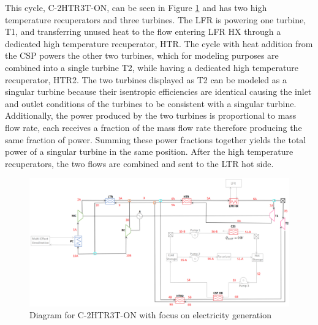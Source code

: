 \begin{paracol}{2}
This cycle, C-2HTR3T-ON, can be seen in Figure \ref{c-2htr3t-on} and has two high temperature recuperators and three turbines. The LFR is powering one turbine, T1, and transferring unused heat to the flow entering LFR HX through a dedicated high temperature recuperator, HTR. The cycle with heat addition from the CSP powers the other two turbines, which for modeling purposes are combined into a single turbine T2, while having a dedicated high temperature recuperator, HTR2. The two turbines displayed as T2 can be modeled as a singular turbine because their isentropic efficiencies are identical causing the inlet and outlet conditions of the turbines to be consistent with a singular turbine. Additionally, the power produced by the two turbines is proportional to mass flow rate, each receives a fraction of the mass flow rate therefore producing the same fraction of power. Summing these power fractions together yields the total power of a singular turbine in the same position. After the high temperature recuperators, the two flows are combined and sent to the LTR hot side. 

\end{paracol}
\begin{figure}[H]
    \widefigure
    \includegraphics[width=\linewidth]{Definitions/c-2htr3t-on.pdf}
    \caption{Diagram for C-2HTR3T-ON with focus on electricity generation\label{c-2htr3t-on}}
\end{figure}
